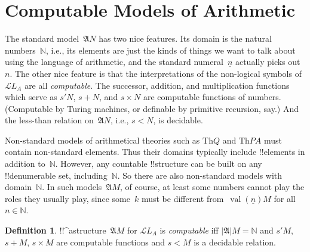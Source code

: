 \documentclass[10pt,a4paper]{article}
\theoremstyle{plain}
\theoremstyle{definition}
\newtheorem{defn}[thm]{Definition}
\theoremstyle{remark}
\newenvironment{explain}{}{}
\newcommand*{\olfileid}[3]{}
\providecommand{\Struct}{\ensuremath{\mathfrak{A}}}
\providecommand{\Domain}{\ensuremath{|\mathfrak{A}|}}
\providecommand{\Assign}{\ensuremath{s}}
\providecommand{\Lang}{\ensuremath{\mathcal{L}}}
\providecommand{\Th}{\ensuremath{\mathrm{Th}}}
\providecommand{\num}[1]{\underline{#1}}
\providecommand{\Nat}{\ensuremath{\mathbb{N}}}
\providecommand{\Value}[1]{\operatorname{val}(#1)}
\begin{document}



\olfileid{mod}{mar}{cmp}
\section{Computable Models of Arithmetic}

\begin{explain}
The standard model~$\Struct{N}$ has two nice features. Its domain is
the natural numbers~$\Nat$, i.e., its elements are just the kinds of
things we want to talk about using the language of arithmetic, and the
standard numeral~$\num{n}$ actually picks out~$n$. The other nice
feature is that the interpretations of the non-logical symbols
of~$\Lang{L_A}$ are all \emph{computable}. The successor, addition,
and multiplication functions which serve as $\Assign{\prime}{N}$,
$\Assign{+}{N}$, and $\Assign{\times}{N}$ are computable functions of
numbers. (Computable by Turing machines, or definable by primitive
recursion, say.) And the less-than relation on~$\Struct{N}$, i.e.,
$\Assign{<}{N}$, is decidable.

Non-standard models of arithmetical theories such as $\Th{Q}$ and
$\Th{PA}$ must contain non-standard elements. Thus their domains
typically include !!{element}s in addition to~$\Nat$. However, any
countable !!{structure} can be built on any !!{denumerable} set,
including~$\Nat$. So there are also non-standard models with
domain~$\Nat$. In such models~$\Struct{M}$, of course, at least some
numbers cannot play the roles they usually play, since some~$k$ must
be different from~$\Value{\num{n}}{M}$ for all~$n \in \Nat$.
\end{explain}

\begin{defn}
!!^a{structure}~$\Struct{M}$ for $\Lang{L_A}$ is \emph{computable} iff
  $\Domain{M} = \Nat$ and $\Assign{\prime}{M}$, $\Assign{+}{M}$,
  $\Assign{\times}{M}$ are computable functions and $\Assign{<}{M}$ is
  a decidable relation.
\end{defn}
\end{document}
